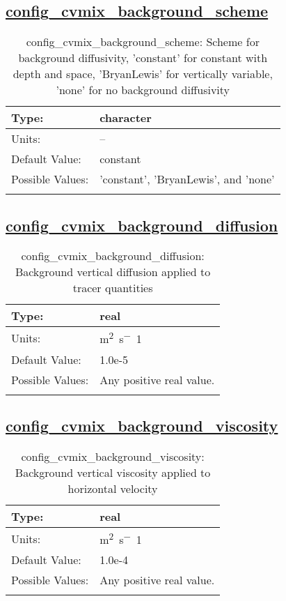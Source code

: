 \subsection[config\_cvmix\_background\_scheme]{\hyperref[sec:nm_tab_cvmix]{config\_cvmix\_background\_scheme}}
\label{subsec:nm_sec_config_cvmix_background_scheme}
\begin{center}
\begin{longtable}{| p{2.0in} || p{4.0in} |}
    \hline
    Type: & character \\
    \hline
    Units: & -- \\
    \hline
    Default Value: & constant \\
    \hline
    Possible Values: & 'constant', 'BryanLewis', and 'none' \\
    \hline
    \caption{config\_cvmix\_background\_scheme: Scheme for background diffusivity, 'constant' for constant with depth and space, 'BryanLewis' for vertically variable, 'none' for no background diffusivity}
\end{longtable}
\end{center}
\subsection[config\_cvmix\_background\_diffusion]{\hyperref[sec:nm_tab_cvmix]{config\_cvmix\_background\_diffusion}}
\label{subsec:nm_sec_config_cvmix_background_diffusion}
\begin{center}
\begin{longtable}{| p{2.0in} || p{4.0in} |}
    \hline
    Type: & real \\
    \hline
    Units: & \si{m^2.s^-1} \\
    \hline
    Default Value: & 1.0e-5 \\
    \hline
    Possible Values: & Any positive real value. \\
    \hline
    \caption{config\_cvmix\_background\_diffusion: Background vertical diffusion applied to tracer quantities}
\end{longtable}
\end{center}
\subsection[config\_cvmix\_background\_viscosity]{\hyperref[sec:nm_tab_cvmix]{config\_cvmix\_background\_viscosity}}
\label{subsec:nm_sec_config_cvmix_background_viscosity}
\begin{center}
\begin{longtable}{| p{2.0in} || p{4.0in} |}
    \hline
    Type: & real \\
    \hline
    Units: & \si{m^2.s^-1} \\
    \hline
    Default Value: & 1.0e-4 \\
    \hline
    Possible Values: & Any positive real value. \\
    \hline
    \caption{config\_cvmix\_background\_viscosity: Background vertical viscosity applied to horizontal velocity}
\end{longtable}
\end{center}
